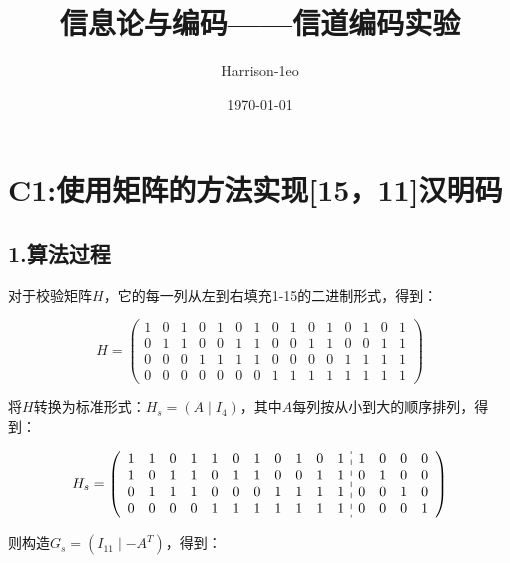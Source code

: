 \documentclass[12pt, a4paper]{ctexart}
\begin{document}
    
    \title {\textbf{信息论与编码——信道编码实验}}
    \author{Harrison-1eo}
    \date{\today}
    \maketitle
    \addtocounter{MaxMatrixCols}{20}

    
\section*{C1:使用矩阵的方法实现[15，11]汉明码}

    \subsection*{1.算法过程}
    
    对于校验矩阵$H$，它的每一列从左到右填充1-15的二进制形式，得到：
    
    $$H = 
    \begin{pmatrix}
        1 & 0 & 1 & 0 & 1 & 0 & 1 & 0 & 1 & 0 & 1 & 0 & 1 & 0 & 1 \\
        0 & 1 & 1 & 0 & 0 & 1 & 1 & 0 & 0 & 1 & 1 & 0 & 0 & 1 & 1 \\
        0 & 0 & 0 & 1 & 1 & 1 & 1 & 0 & 0 & 0 & 0 & 1 & 1 & 1 & 1 \\
        0 & 0 & 0 & 0 & 0 & 0 & 0 & 1 & 1 & 1 & 1 & 1 & 1 & 1 & 1 
    \end{pmatrix}
    $$   

    将$H$转换为标准形式：$H_s = \left( A \mid I_4\right)$，其中$A$每列按从小到大的顺序排列，得到：
    
    $$H_s = 
    \left(\begin{array}{ccccccccccc:cccc}
        1 & 1 & 0 & 1 & 1 & 0 & 1 & 0 & 1 & 0 & 1 & 1 & 0 & 0 & 0 \\
        1 & 0 & 1 & 1 & 0 & 1 & 1 & 0 & 0 & 1 & 1 & 0 & 1 & 0 & 0 \\
        0 & 1 & 1 & 1 & 0 & 0 & 0 & 1 & 1 & 1 & 1 & 0 & 0 & 1 & 0 \\
        0 & 0 & 0 & 0 & 1 & 1 & 1 & 1 & 1 & 1 & 1 & 0 & 0 & 0 & 1 
    \end{array}\right)
    $$

    则构造$G_s = \left( I_{11} \mid -A^T \right)$，得到：
\end{document}
